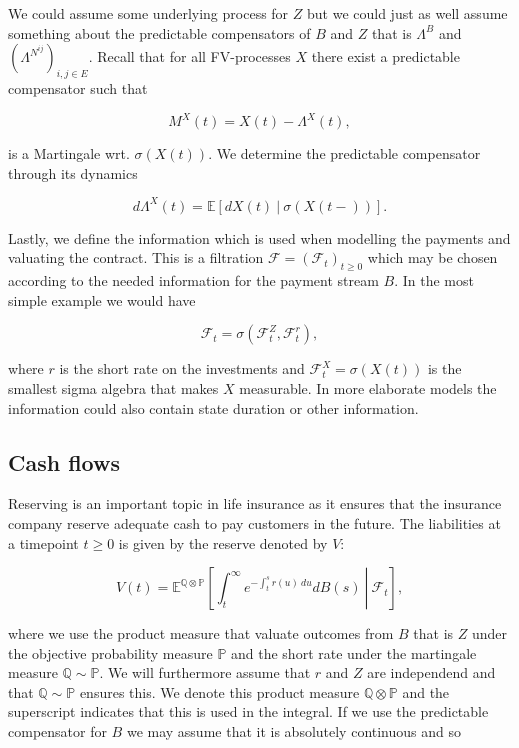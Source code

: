 \documentclass[a4paper,10pt,openany]{book}
\begin{document}
We could assume some underlying process for \(Z\) but we could just as well assume something about the predictable compensators of \(B\) and \(Z\) that is \(\Lambda^B\) and \((\Lambda^{N^{ij}})_{i,j\in E}\). Recall that for all FV-processes \(X\) there exist a predictable compensator such that

\[
M^X(t)=X(t)-\Lambda^X(t),
\]

is a Martingale wrt. \(\sigma(X(t))\). We determine the predictable compensator through its dynamics

\[
d\Lambda^X(t)=\mathbb E[dX(t)\ \vert\ \sigma(X(t-))].
\]

Lastly, we define the information which is used when modelling the payments and valuating the contract. This is a filtration \(\mathcal F=(\mathcal F_t)_{t\ge 0}\) which may be chosen according to the needed information for the payment stream \(B\). In the most simple example we would have

\[
\mathcal F_t=\sigma\left(\mathcal F_t^{Z},\mathcal F_t^{r}\right),
\]

where \(r\) is the short rate on the investments and \(\mathcal F_t^X=\sigma(X(t))\) is the smallest sigma algebra that makes \(X\) measurable. In more elaborate models the information could also contain state duration or other information.

\hypertarget{cash-flows}{%
\subsection{Cash flows}\label{cash-flows}}

Reserving is an important topic in life insurance as it ensures that the insurance company reserve adequate cash to pay customers in the future. The liabilities at a timepoint \(t\ge 0\) is given by the reserve denoted by \(V\):

\[
V(t)=\mathbb E^{\mathbb Q\otimes \mathbb P}\left[\left.\int_t^\infty e^{-\int_t^sr(u)\ du}dB(s)\ \right\vert\ \mathcal F_t\right],
\]

where we use the product measure that valuate outcomes from \(B\) that is \(Z\) under the objective probability measure \(\mathbb P\) and the short rate under the martingale measure \(\mathbb Q\sim\mathbb P\). We will furthermore assume that \(r\) and \(Z\) are independend and that \(\mathbb Q\sim\mathbb P\) ensures this. We denote this product measure \(\mathbb Q\otimes \mathbb P\) and the superscript indicates that this is used in the integral. If we use the predictable compensator for \(B\) we may assume that it is absolutely continuous and so
\end{document}
